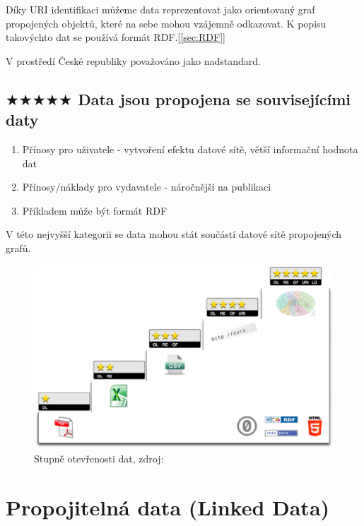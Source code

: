 Díky URI identifikaci můžeme data reprezentovat jako orientovaný graf propojených objektů, které na sebe mohou vzájemně odkazovat. K popisu takovýchto dat se používá formát RDF.[\ref{sec:RDF}]  

V prostředí České republiky považováno jako nadstandard.

\subsection*{$\bigstar\bigstar\bigstar\bigstar\bigstar$ Data jsou propojena se souvisejícími daty}

\medskip

\begin{enumerate}
\item Přínosy pro uživatele - vytvoření efektu datové sítě, větší informační hodnota dat    
\item Přínosy/náklady pro vydavatele - náročnější na publikaci
\item Příkladem může být formát RDF
\end{enumerate}

V této nejvyšší kategorii se data mohou stát součástí datové sítě propojených grafů.

\begin{figure}[h]
\centerline{\includegraphics[width=\textwidth]{img/5star_steps.eps}}
\caption{Stupně otevřenosti dat, zdroj: \cite{5starInfo}}
\label{obr:5star_steps}
\end{figure}

\newpage

\section{Propojitelná data (Linked Data)}

